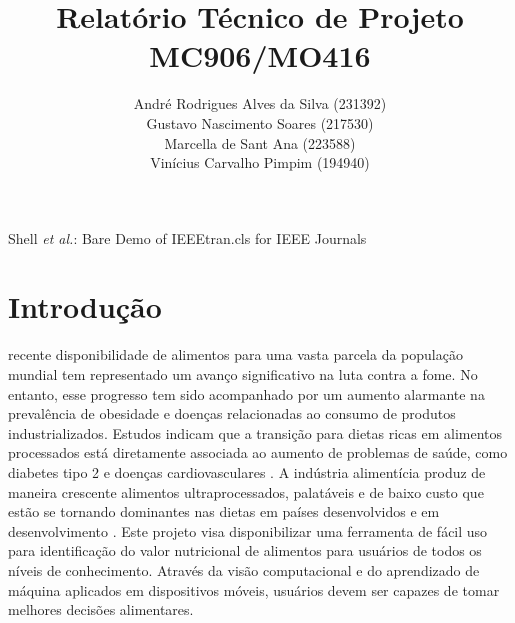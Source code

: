 \documentclass[journal]{IEEEtran}
\begin{document}
\title{Relatório Técnico de Projeto\\ MC906/MO416 }

\author{
André Rodrigues Alves da Silva (231392) \\
Gustavo Nascimento Soares (217530) \\ 
Marcella de Sant Ana (223588) \\
Vinícius Carvalho Pimpim (194940)
} %




%
{Shell \MakeLowercase{\textit{et al.}}: Bare Demo of IEEEtran.cls for IEEE Journals}

\maketitle

\renewcommand{\abstractname}{Resumo\hspace{0.1cm}}


\IEEEpeerreviewmaketitle


\section{Introdução}
\label{sec:introducao}

 recente disponibilidade de alimentos para uma vasta parcela da população mundial tem representado um avanço significativo na luta contra a fome. No entanto, esse progresso tem sido acompanhado por um aumento alarmante na prevalência de obesidade e doenças relacionadas ao consumo de produtos industrializados. Estudos indicam que a transição para dietas ricas em alimentos processados está diretamente associada ao aumento de problemas de saúde, como diabetes tipo 2 e doenças cardiovasculares \cite{popkin2015nutrition}. A indústria alimentícia produz de maneira crescente alimentos ultraprocessados, palatáveis e de baixo custo que estão se tornando dominantes nas dietas em países desenvolvidos e em desenvolvimento \cite{monteiro2013ultra}. Este projeto visa disponibilizar uma ferramenta de fácil uso para identificação do valor nutricional de alimentos para usuários de todos os níveis de conhecimento. Através da visão computacional e do aprendizado de máquina aplicados em dispositivos móveis, usuários devem ser capazes de tomar melhores decisões alimentares.
\end{document}
